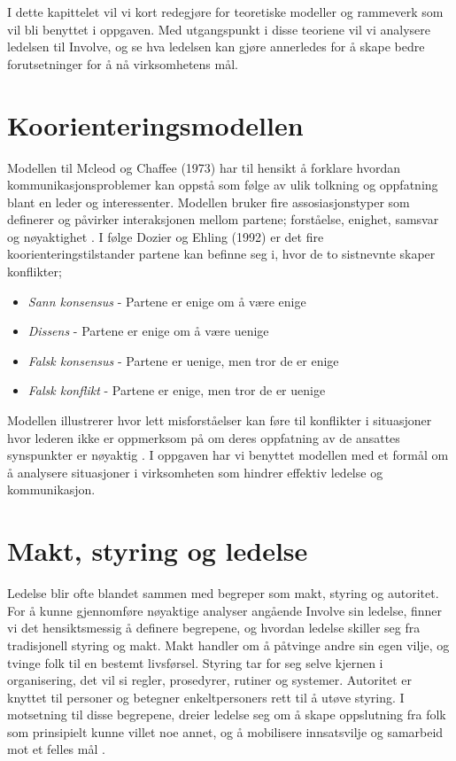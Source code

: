 I dette kapittelet vil vi kort redegjøre for teoretiske modeller og rammeverk som vil bli benyttet i oppgaven. Med utgangspunkt i disse teoriene vil vi analysere ledelsen til Involve, og se hva ledelsen kan gjøre annerledes for å skape bedre forutsetninger for å nå virksomhetens mål.

\section{Koorienteringsmodellen}
Modellen til Mcleod og Chaffee (1973) har til hensikt å forklare hvordan kommunikasjonsproblemer kan oppstå som følge av ulik tolkning og oppfatning blant en leder og interessenter. Modellen bruker fire assosiasjonstyper som definerer og påvirker interaksjonen mellom partene; forståelse, enighet, samsvar og nøyaktighet \cite[s.~157]{KommunikasjonForLedere}. I følge Dozier og Ehling (1992) er det fire koorienteringstilstander partene kan befinne seg i, hvor de to sistnevnte skaper konflikter;

\begin{itemize}
\item\textit{Sann konsensus} - Partene er enige om å være enige
\item\textit{Dissens} - Partene er enige om å være uenige
\item\textit{Falsk konsensus} - Partene er uenige, men tror de er enige
\item\textit{Falsk konflikt} - Partene er enige, men tror de er uenige
\end{itemize}

Modellen illustrerer hvor lett misforståelser kan føre til konflikter i situasjoner hvor lederen ikke er oppmerksom på om deres oppfatning av de ansattes synspunkter er nøyaktig \cite[s.~158]{KommunikasjonForLedere}. I oppgaven har vi benyttet modellen med et formål om å analysere situasjoner i virksomheten som hindrer effektiv ledelse og kommunikasjon.

\section{Makt, styring og ledelse}
Ledelse blir ofte blandet sammen med begreper som makt, styring og autoritet. For å kunne gjennomføre nøyaktige analyser angående Involve sin ledelse, finner vi det hensiktsmessig å definere begrepene, og hvordan ledelse skiller seg fra tradisjonell styring og makt. Makt handler om å påtvinge andre sin egen vilje, og tvinge folk til en bestemt livsførsel. Styring tar for seg selve kjernen i organisering, det vil si regler, prosedyrer, rutiner og systemer. Autoritet er knyttet til personer og betegner enkeltpersoners rett til å utøve styring. I motsetning til disse begrepene, dreier ledelse seg om å skape oppslutning fra folk som prinsipielt kunne villet noe annet, og å mobilisere innsatsvilje og samarbeid mot et felles mål \cite[s.~130]{KommunikasjonForLedere}.

